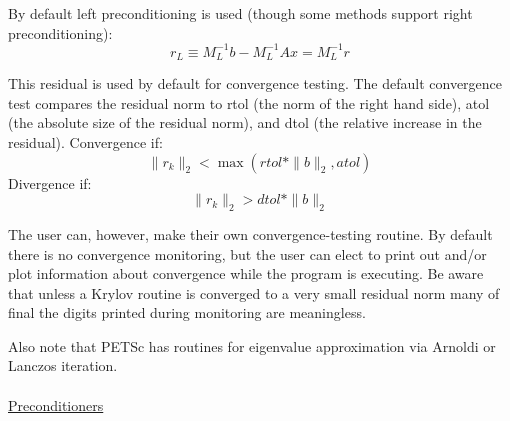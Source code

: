 \documentclass[12pt,twoside]{article}
\begin{document}
By default left preconditioning is used (though some methods support right preconditioning):
\begin{equation}
r_{L} \equiv M_{L}^{-1}b - M_{L}^{-1}Ax = M_{L}^{-1}r
\end{equation}

This residual is used by default for convergence testing. The default convergence test compares the residual norm to rtol (the norm of the right hand side), atol (the absolute size of the residual norm), and dtol (the relative increase in the residual). Convergence if:
\begin{equation*}
 \|r_{k}\|_{2}  < \max \left(rtol*\|b\|_{2}, atol\right)
\end{equation*}
Divergence if:
\begin{equation*}
\|r_{k}\|_{2}  > dtol*\|b\|_{2}
\end{equation*}

The user can, however, make their own convergence-testing routine. By default there is no convergence monitoring, but the user can elect to print out and/or plot information about convergence while the program is executing. Be aware that unless a Krylov routine is converged to a very small residual norm many of final the digits printed during monitoring are meaningless. 

Also note that PETSc has routines for eigenvalue approximation via Arnoldi or Lanczos iteration. \\
\\
\underline{Preconditioners}
\end{document}
